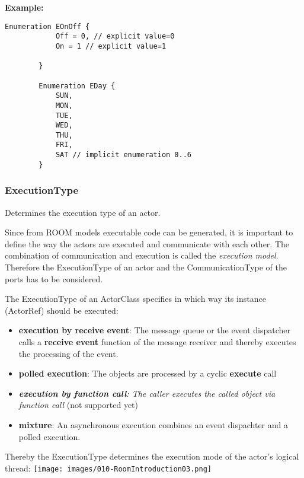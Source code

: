 		
	\textbf{Example:}
	
		\begin{lstlisting}[language=ROOM]
		Enumeration EOnOff {
			Off = 0, // explicit value=0
			On = 1 // explicit value=1 
		
		}
		
		Enumeration EDay {
			SUN,
			MON,
			TUE,
			WED,
			THU,
			FRI,
			SAT // implicit enumeration 0..6
		}
		\end{lstlisting}
	
	\vspace{\baselineskip}
	\vspace{\baselineskip}
	\vspace{\baselineskip}
	
\subsubsection{ExecutionType}
	\hypertarget{ref:ExecutionType}{}
	Determines the execution type of an actor.
		
	Since from ROOM models executable code can be generated, it is important to define the way the actors are 
	executed and communicate with each other. The combination of communication and execution is called the 
	\emph{execution model}. Therefore the ExecutionType of an actor and the CommunicationType of the ports has to be considered.
	
	The ExecutionType of an ActorClass specifies in which way its instance (ActorRef) should be executed:
	\begin{itemize}
	\item \textbf{execution by receive event}: The message queue or the event dispatcher calls a 
	\textbf{receive event} function of the message receiver and thereby executes the processing of the event.
	\item \textbf{polled execution}: The objects are processed by a cyclic \textbf{execute} call
	\item \textit{\textbf{execution by function call}: The caller executes the called object via function call} (not supported yet)
	\item \textbf{mixture}: An asynchronous execution combines an event dispachter and a polled execution.
	\end{itemize}
	
	Thereby the ExecutionType determines the execution mode of the actor's logical thread:
	\texttt{[image: images/010-RoomIntroduction03.png]}
			
